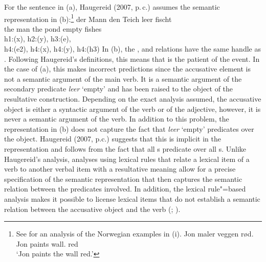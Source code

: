 \begin{exe}
\begin{xlist}[iv.]
\begin{exe}
\begin{xlist}[iv.]
For the sentence in (a), Haugereid (2007, p.\,c.) assumes the semantic representation in (b):\footnote{%
  See  for an analysis of the Norwegian examples in (i).
\ea
\gll Jon maler veggen rød.\\
     Jon paints wall. red\\
\glt `Jon paints the wall red.'
\zlast
}
\eal
\ex 
\gll der Mann den Teich leer fischt\\
	 the man the pond empty fishes\\
\ex h1:(x), h2:(y), h3:(e),\\
    h4:(e2), h4:(x), h4:(y), h4:(h3)
\zl
In (b), the ,  and  relations have the same handle as . 
Following Haugereid's definitions, this means that  is the patient of the event. In the case of
(a), this makes incorrect predictions since the accusative element is not a semantic argument of the main
verb. It is a semantic argument of the secondary predicate \emph{leer} `empty' and has been raised to the object
of the resultative construction. Depending on the exact analysis assumed, the accusative object is either a syntactic
argument of the verb or of the adjective, however, it is never a semantic argument of the verb. In addition to this problem,
the representation in (b) does not capture the fact that \emph{leer} `empty' predicates over the object. Haugereid (2007, p.c.) suggests
that this is implicit in the representation and follows from the fact that all s predicate over all s.
Unlike Haugereid's analysis, analyses using lexical rules that relate a lexical item of a verb to
another verbal item with a resultative meaning allow for a precise specification of the semantic representation
that then captures the semantic relation between the predicates involved. In addition, the lexical
rule"=based analysis makes it possible to license lexical items  that do not establish a semantic relation between the accusative object and the verb
(\citealp{Wechsler97a,WN2001a};
\citealp[Chapter~5]{Mueller2002b}).


\end{xlist}
\end{exe}
\end{xlist}
\end{exe}
